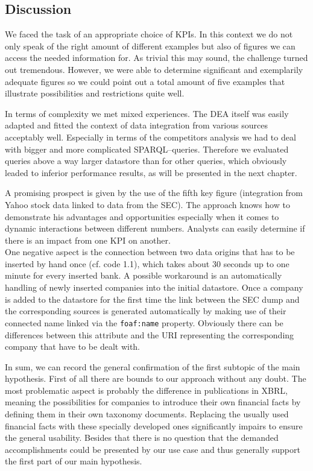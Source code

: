 \documentclass[runningheads]{llncs}
\begin{document}
\subsection{Discussion}\label{5.1.}
We faced the task of an appropriate choice of KPIs. In this context we do not only speak of the right amount of different examples but also of figures we can access the needed information for. As trivial this may sound, the challenge turned out tremendous. However, we were able to determine significant and exemplarily adequate figures so we could point out a total amount of five examples that illustrate possibilities and restrictions quite well.

In terms of complexity we met mixed experiences. The DEA itself was easily adapted and fitted the context of data integration from various sources acceptably well. Especially in terms of the competitors analysis we had to deal with bigger and more complicated SPARQL--queries. Therefore we evaluated queries above a way larger datastore than for other queries, which obviously leaded to inferior performance results, as will be presented in the next chapter.

A promising prospect is given by the use of the fifth key figure (integration from Yahoo stock data linked to data from the SEC). The approach knows how to demonstrate his advantages and opportunities especially when it comes to dynamic interactions between different numbers. Analysts can easily determine if there is an impact from one KPI on another.\\
One negative aspect is the connection between two data origins that has to be inserted by hand once (cf. code 1.1), which takes about 30 seconds up to one minute for every inserted bank. A possible workaround is an automatically handling of newly inserted companies into the initial datastore. Once a company is added to the datastore for the first time the link between the SEC dump and the corresponding sources is generated automatically by making use of their connected name linked via the {\tt foaf:name} property. Obviously there can be differences between this attribute and the URI representing the corresponding company that have to be dealt with.

In sum, we can record the general confirmation of the first subtopic of the main hypothesis.
First of all there are bounds to our approach without any doubt.
The most problematic aspect is probably the difference in publications in XBRL, meaning the possibilities for companies to introduce their own financial facts by defining them in their own taxonomy documents.
Replacing the usually used financial facts with these specially developed ones significantly impairs to ensure the general usability.
Besides that there is no question that the demanded accomplishments could be presented by our use case and thus generally support the first part of our main hypothesis.
\end{document}
